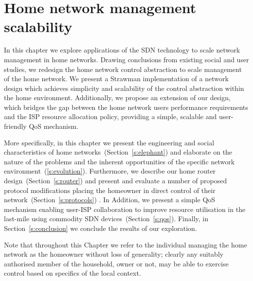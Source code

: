 \chapter{Home network management scalability} \label{sec:homework} 

\ifpdf
\graphicspath{{Chapter2/Chapter2Figs/PNG/}{Chapter2/Chapter2Figs/PDF/}{Chapter2/Chapter2Figs/}}
\else 
\graphicspath{{Chapter2/Chapter2Figs/EPS/}{Chapter2/Chapter2Figs/}} 
\fi

In this chapter we explore applications of the SDN technology to scale network
management in home networks. Drawing conclusions from existing social and user
studies, we redesign the home network control abstraction to scale management of
the home network. We present a Strawman implementation of a network design which
achieves simplicity and scalability of the control abstraction within the home
environment. Additionally, we propose an extension of our design, which bridges
the gap between the home network users performance requirements and the ISP
resource allocation policy, providing a simple, scalable and user-friendly QoS
mechanism.

More specifically, in this chapter we present the engineering and social
characteristics of home networks~(Section~\ref{s:elephant}) and elaborate on the
nature of the problems and the inherent opportunities of the specific network
environment~(\ref{s:evolution}).  Furthermore, we describe our home router
design~(Section~\ref{s:router}) and present and evaluate a number of proposed
protocol modifications placing the homeowner in direct control of their
network~(Section~\ref{s:protocols}) . In Addition, we present a simple QoS
mechanism enabling user-ISP collaboration to improve resource utilisation in the
last-mile using commodity SDN devices~(Section~\ref{s:qos}). Finally, in
Section~\ref{s:conclusion} we conclude the results of our exploration.

Note that throughout this Chapter we refer to the individual managing the home
network as the homeowner without loss of generality; clearly any suitably
authorised member of the household, owner or not, may be able to exercise control
based on specifics of the local context. 


